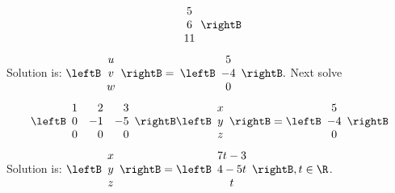 \begin{enumialphparenastyle}
\begin{ex}
\begin{sol}
\[\begin{array}{c}
5 \\
6 \\
11
\end{array}
\rightB
\]
Solution is: $\leftB
\begin{array}{c}
u \\
v \\
w
\end{array}
\rightB =$ $\leftB
\begin{array}{c}
5 \\
-4 \\
0
\end{array}
\rightB .$ Next solve
\[
\leftB
\begin{array}{rrr}
1 & 2 & 3 \\
0 & -1 & -5 \\
0 & 0 & 0
\end{array}
\rightB \leftB
\begin{array}{c}
x \\
y \\
z
\end{array}
\rightB =\leftB
\begin{array}{c}
5 \\
-4 \\
0
\end{array}
\rightB
\]
Solution is: $\leftB
\begin{array}{c}
x \\
y \\
z
\end{array}
\rightB =\leftB
\begin{array}{c}
7t-3 \\
4-5t \\
t
\end{array}
\rightB ,t\in \R$.
\end{sol}
\end{ex}


\end{enumialphparenastyle}

